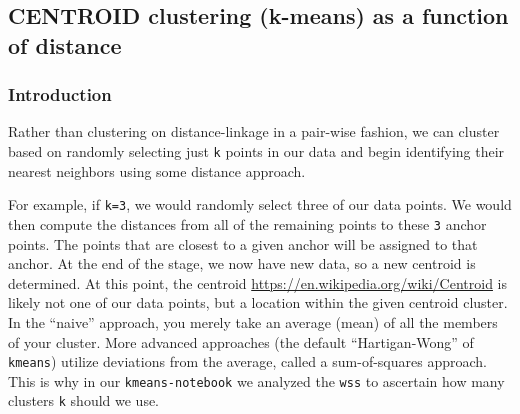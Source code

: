 \documentclass[
]{article}
\newenvironment{Shaded}{\begin{snugshade}}{\end{snugshade}}
\newcommand{\CommentTok}[1]{\textcolor[rgb]{0.56,0.35,0.01}{\textit{#1}}}
\begin{document}
\begin{Shaded}
\end{Shaded}

\hypertarget{centroid-clustering-k-means-as-a-function-of-distance}{%
\subsection{CENTROID clustering (k-means) as a function of
distance}\label{centroid-clustering-k-means-as-a-function-of-distance}}

\hypertarget{introduction-2}{%
\subsubsection{Introduction}\label{introduction-2}}

Rather than clustering on distance-linkage in a pair-wise fashion, we
can cluster based on randomly selecting just \texttt{k} points in our
data and begin identifying their nearest neighbors using some distance
approach.

For example, if \texttt{k=3}, we would randomly select three of our data
points. We would then compute the distances from all of the remaining
points to these \texttt{3} anchor points. The points that are closest to
a given anchor will be assigned to that anchor. At the end of the stage,
we now have new data, so a new centroid is determined. At this point,
the centroid \url{https://en.wikipedia.org/wiki/Centroid} is likely not
one of our data points, but a location within the given centroid
cluster. In the ``naive'' approach, you merely take an average (mean) of
all the members of your cluster. More advanced approaches (the default
``Hartigan-Wong'' of \texttt{kmeans}) utilize deviations from the
average, called a sum-of-squares approach. This is why in our
\texttt{kmeans-notebook} we analyzed the \texttt{wss} to ascertain how
many clusters \texttt{k} should we use.
\end{document}

